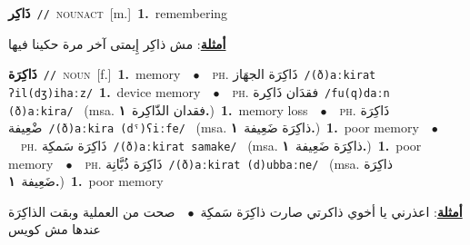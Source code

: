 \documentclass[10pt,a4paper,twoside]{article} %
\begin{document}
\begin{multicols}{2}
{{{{{\setlength\topsep{0pt}\textbf{\foreignlanguage{arabic}{ذَاكِر}}\ {\color{gray}\texttt{//}\color{black}}\ \textsc{noun\textunderscore act}\ [m.]\ \textbf{1.}~remembering\  \begin{flushright}\color{gray}\foreignlanguage{arabic}{\textbf{\underline{\foreignlanguage{arabic}{أمثلة}}}: مش ذاكِر إِيمتى آخر مرة حكينا فيها}\end{flushright}\color{black}} \vspace{2mm}

{\setlength\topsep{0pt}\textbf{\foreignlanguage{arabic}{ذَاكِرَة}}\ {\color{gray}\texttt{//}\color{black}}\ \textsc{noun}\ [f.]\ \textbf{1.}~memory\ \ $\bullet$\ \ \textsc{ph.} \color{gray} \foreignlanguage{arabic}{ذَاكِرَة الجهَاز}\color{black}\ {\color{gray}\texttt{/{\sffamily (ð)aːkirat ʔil(dʒ)ihaːz}/}\color{black}}\ \textbf{1.}~device memory\ \ $\bullet$\ \ \textsc{ph.} \color{gray} \foreignlanguage{arabic}{فقدَان ذَاكِرة}\color{black}\ {\color{gray}\texttt{/{\sffamily fu(q)daːn (ð)aːkira}/}\color{black}}\ \color{gray} (msa. \foreignlanguage{arabic}{فقدان الذّاكِرة}~\foreignlanguage{arabic}{\textbf{١.}})\color{black}\ \textbf{1.}~memory loss\ \ $\bullet$\ \ \textsc{ph.} \color{gray} \foreignlanguage{arabic}{ذَاكِرَة ضْعِيفة}\color{black}\ {\color{gray}\texttt{/{\sffamily (ð)aːkira (dˤ)ʕiːfe}/}\color{black}}\ \color{gray} (msa. \foreignlanguage{arabic}{ذاكِرَة ضَعِيفة}~\foreignlanguage{arabic}{\textbf{١.}})\color{black}\ \textbf{1.}~poor memory\ \ $\bullet$\ \ \textsc{ph.} \color{gray} \foreignlanguage{arabic}{ذَاكِرَة سَمكِة}\color{black}\ {\color{gray}\texttt{/{\sffamily (ð)aːkirat samake}/}\color{black}}\ \color{gray} (msa. \foreignlanguage{arabic}{ذاكِرَة ضَعِيفة}~\foreignlanguage{arabic}{\textbf{١.}})\color{black}\ \textbf{1.}~poor memory\ \ $\bullet$\ \ \textsc{ph.} \color{gray} \foreignlanguage{arabic}{ذَاكِرَة ذُبَّانِة}\color{black}\ {\color{gray}\texttt{/{\sffamily (ð)aːkirat (d)ubbaːne}/}\color{black}}\ \color{gray} (msa. \foreignlanguage{arabic}{ذاكِرَة ضَعِيفة}~\foreignlanguage{arabic}{\textbf{١.}})\color{black}\ \textbf{1.}~poor memory\  \begin{flushright}\color{gray}\foreignlanguage{arabic}{\textbf{\underline{\foreignlanguage{arabic}{أمثلة}}}: اعذرني يا أخوي ذاكرتي صارت ذاكِرَة سَمكِة\ $\bullet$\ \  صحت من العملية وبقت الذاكِرَة عندها مش كويس}\end{flushright}\color{black}} \vspace{2mm}

}}}}
\end{multicols}
\end{document}

